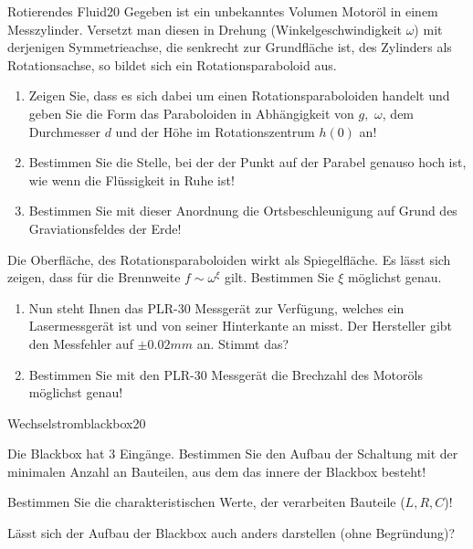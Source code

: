 \begin{problem}{Rotierendes Fluid}{20}
Gegeben ist ein unbekanntes Volumen Motoröl in einem Messzylinder. Versetzt man diesen in Drehung (Winkelgeschwindigkeit $\omega$) mit derjenigen Symmetrieachse, die senkrecht zur Grundfläche ist, des Zylinders als Rotationsachse, so bildet sich ein Rotationsparaboloid aus.
\begin{abcenum}
 \item
  \begin{enumerate} 
   \item Zeigen Sie, dass es sich dabei um einen Rotationsparaboloiden handelt und geben Sie die Form das Paraboloiden in Abhängigkeit von $g,$ $\omega$, dem Durchmesser $d$ und der Höhe im Rotationszentrum $h(0)$ an!
   \item Bestimmen Sie die Stelle, bei der der Punkt auf der Parabel genauso hoch ist, wie wenn die Flüssigkeit in Ruhe ist!
   \item Bestimmen Sie mit dieser Anordnung die Ortsbeschleunigung auf Grund des Graviationsfeldes der Erde!
  \end{enumerate}
\item Die Oberfläche, des Rotationsparaboloiden wirkt als Spiegelfläche. Es lässt sich zeigen, dass für die Brennweite $f \sim \omega^{\xi}$ gilt. Bestimmen Sie $\xi$ möglichst genau.
\item
\begin{enumerate}
 \item Nun steht Ihnen das PLR-30 Messgerät zur Verfügung, welches ein Lasermessgerät ist und von seiner Hinterkante an misst. Der Hersteller gibt den Messfehler auf $\pm 0.02\unit{mm}$ an. Stimmt das?
 \item Bestimmen Sie mit den PLR-30 Messgerät die Brechzahl des Motoröls möglichst genau!
\end{enumerate}
\end{abcenum}
\end{problem}

\begin{problem}{Wechselstromblackbox}{20}
\begin{abcenum}
 \item Die Blackbox hat $3$ Eingänge. Bestimmen Sie den Aufbau der Schaltung mit der minimalen Anzahl an Bauteilen, aus dem das innere der Blackbox besteht!
 \item Bestimmen Sie die charakteristischen Werte, der verarbeiten Bauteile ($L, R, C$)!
 \item Lässt sich der Aufbau der Blackbox auch anders darstellen (ohne Begründung)?
\end{abcenum}
\end{problem}


% 
% 

